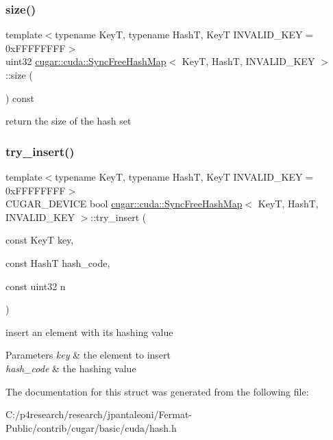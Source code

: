 \subsubsection{\texorpdfstring{size()}{size()}}
{\footnotesize\ttfamily template$<$typename KeyT, typename HashT, KeyT I\+N\+V\+A\+L\+I\+D\+\_\+\+K\+EY = 0x\+F\+F\+F\+F\+F\+F\+FF$>$ \\
uint32 \hyperlink{structcugar_1_1cuda_1_1_sync_free_hash_map}{cugar\+::cuda\+::\+Sync\+Free\+Hash\+Map}$<$ KeyT, HashT, I\+N\+V\+A\+L\+I\+D\+\_\+\+K\+EY $>$\+::size (\begin{DoxyParamCaption}{ }\end{DoxyParamCaption}) const\hspace{0.3cm}{\ttfamily [inline]}}

return the size of the hash set \mbox{\label{structcugar_1_1cuda_1_1_sync_free_hash_map_a2de3977000dd6f1c4912e0e17667f014}} 
\subsubsection{\texorpdfstring{try\+\_\+insert()}{try\_insert()}}
{\footnotesize\ttfamily template$<$typename KeyT, typename HashT, KeyT I\+N\+V\+A\+L\+I\+D\+\_\+\+K\+EY = 0x\+F\+F\+F\+F\+F\+F\+FF$>$ \\
C\+U\+G\+A\+R\+\_\+\+D\+E\+V\+I\+CE bool \hyperlink{structcugar_1_1cuda_1_1_sync_free_hash_map}{cugar\+::cuda\+::\+Sync\+Free\+Hash\+Map}$<$ KeyT, HashT, I\+N\+V\+A\+L\+I\+D\+\_\+\+K\+EY $>$\+::try\+\_\+insert (\begin{DoxyParamCaption}\item[{const KeyT}]{key,  }\item[{const HashT}]{hash\+\_\+code,  }\item[{const uint32}]{n }\end{DoxyParamCaption})\hspace{0.3cm}{\ttfamily [inline]}}

insert an element with its hashing value


\begin{DoxyParams}{Parameters}
{\em key} & the element to insert \\
\hline
{\em hash\+\_\+code} & the hashing value \\
\hline
\end{DoxyParams}


The documentation for this struct was generated from the following file\+:\begin{DoxyCompactItemize}
\item 
C\+:/p4research/research/jpantaleoni/\+Fermat-\/\+Public/contrib/cugar/basic/cuda/hash.\+h\end{DoxyCompactItemize}
